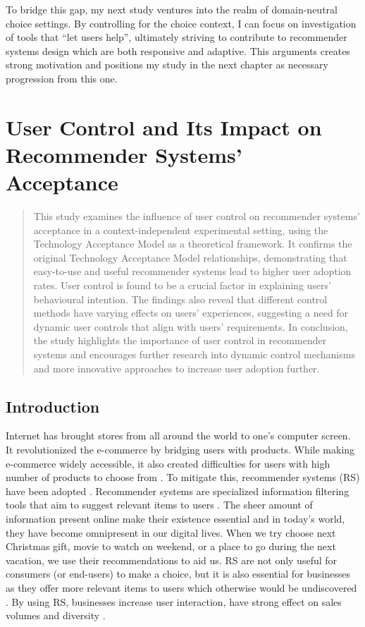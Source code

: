 \documentclass[a4paper,12pt]{article}
\begin{document}
To bridge this gap, my next study ventures into the realm of domain-neutral choice settings. By controlling for the choice context, I can focus on investigation of tools that ``let users help'', ultimately striving to contribute to recommender systems design which are both responsive and adaptive. This arguments creates strong motivation and positions my study in the next chapter as necessary progression from this one.


\newpage


\section{User Control and Its Impact on Recommender Systems' Acceptance}\label{chapter:UserControlAndRS}
\begin{abstract}

    This study examines the influence of user control on recommender systems' acceptance in a context-independent experimental setting, using the Technology Acceptance Model as a theoretical framework. It confirms the original  Technology Acceptance Model relationships, demonstrating that easy-to-use and useful recommender systems lead to higher user adoption rates. User control is found to be a crucial factor in explaining users' behavioural  intention. The findings also reveal that different control methods have varying effects on users' experiences, suggesting a need for dynamic user controls that align with users' requirements. In conclusion, the study highlights the importance of user control in recommender systems and encourages further research into dynamic control mechanisms and more innovative approaches to increase user adoption further.
    
\end{abstract}

\subsection{Introduction}

Internet has brought stores from all around the world to one's computer screen. It revolutionized the e-commerce by bridging users with products. While making e-commerce widely accessible, it also created difficulties for users with high number of products to choose from \citep{ricci2011introduction}. To mitigate this, recommender systems (RS) have been adopted \citep{kotkovSurveySerendipityRecommender2016}. Recommender systems are specialized information filtering tools that aim to suggest relevant items to users \citep{adomavicius2005toward}. The sheer amount of information present online make their existence essential and in today's  world, they have become omnipresent in our digital lives. When we try choose next Christmas gift, movie to watch on weekend, or a place to go during the next vacation, we use their recommendations to aid us. RS are not only useful for consumers (or end-users) to make a choice, but it is also essential for businesses as they offer more relevant items to users which otherwise would be undiscovered \citep{ricci2011introduction}. By using RS, businesses increase user interaction, have strong effect on sales volumes and diversity \citep{songWhenHowDiversify2019}.
\end{document}
